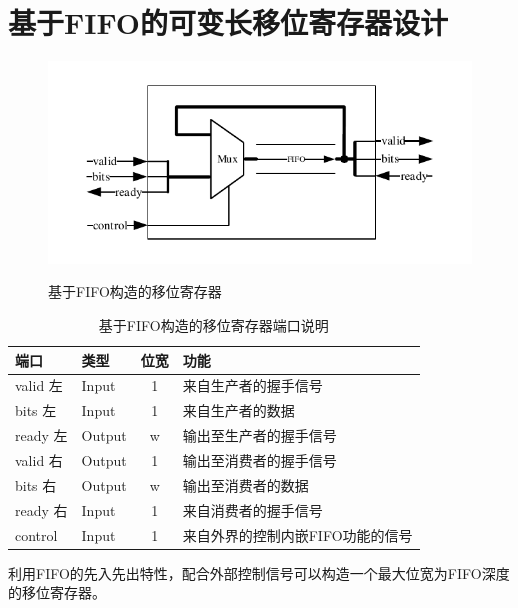\section{基于FIFO的可变长移位寄存器设计}
\begin{figure}[h]
    \centering
    \includegraphics[scale=1.1]{../pdf/fifoshift.pdf}\\
    \caption{基于FIFO构造的移位寄存器}
\end{figure}
\begin{table}[h] %
    \centering
    \caption{基于FIFO构造的移位寄存器端口说明} %
    \begin{tabular}{l|l|c|l} %
    \hline  
    \hline  
    端口 & 类型 & 位宽 & 功能 \\ %
    \hline %
    valid 左 & Input & 1 & 来自生产者的握手信号 \\  
    \hline  
    bits 左 & Input & 1 & 来自生产者的数据 \\  
    \hline  
    ready 左 & Output & w\footnotemark[1] &输出至生产者的握手信号 \\  
    \hline  
    valid 右 & Output & 1 & 输出至消费者的握手信号 \\  
    \hline  
    bits 右 & Output & w & 输出至消费者的数据 \\  
    \hline  
    ready 右 & Input & 1 & 来自消费者的握手信号\\  
    \hline  
    control & Input & 1 & 来自外界的控制内嵌FIFO功能的信号\\  
    \hline  
    \hline  
    \end{tabular}  
\end{table}
利用FIFO的先入先出特性，配合外部控制信号可以构造一个最大位宽为FIFO深度的移位寄存器。
